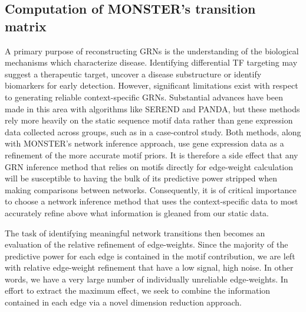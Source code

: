 \documentclass[9pt,twocolumn,twoside]{pnas-new}
\begin{document}
\subsection*{Computation of MONSTER\textquoteright s transition matrix}

A primary purpose of reconstructing GRNs is the understanding of the
biological mechanisms which characterize disease. Identifying differential
TF targeting may suggest a therapeutic target, uncover a disease substructure
or identify biomarkers for early detection. However, significant limitations
exist with respect to generating reliable context-specific GRNs. Substantial
advances have been made in this area with algorithms like SEREND and
PANDA, but these methods rely more heavily on the static sequence
motif data rather than gene expression data collected across groups,
such as in a case-control study. Both methods, along with MONSTER's
network inference approach, use gene expression data as a refinement
of the more accurate motif priors. It is therefore a side effect that
any GRN inference method that relies on motifs directly for edge-weight
calculation will be susceptible to having the bulk of its predictive
power stripped when making comparisons between networks. Consequently,
it is of critical importance to choose a network inference method
that uses the context-specific data to most accurately refine above
what information is gleaned from our static data.

The task of identifying meaningful network transitions then becomes
an evaluation of the relative refinement of edge-weights. Since the
majority of the predictive power for each edge is contained in the
motif contribution, we are left with relative edge-weight refinement
that have a low signal, high noise. In other words, we have a very
large number of individually unreliable edge-weights. In effort to
extract the maximum effect, we seek to combine the information contained
in each edge via a novel dimension reduction approach.
\end{document}
